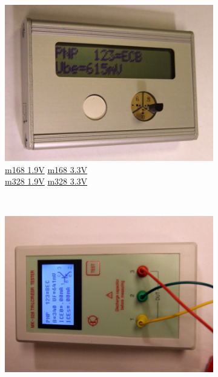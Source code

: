 \documentclass[pdftex,12pt,a4paper,english]{article}
\begin{document}
\begin{figure}[H]
  \begin{subfigure}[b]{.3\textwidth}
    \centering
    \includegraphics[width=1.\textwidth]{../PNG/Fifi_total.JPG}
	  \\ \vspace{-1.em}
	  {\href{run:./trunk/mega168_1.9V/.}{m168 1.9V}} \hspace{10pt}
	  {\href{run:./trunk/mega168_3.3V/.}{m168 3.3V}} \\
	  {\href{run:./trunk/mega328_1.9V/.}{m328 1.9V}} \hspace{10pt}
	  {\href{run:./trunk/mega328_3.3V/.}{m328 3.3V}}
  \end{subfigure}
~
  \begin{subfigure}[b]{.3\textwidth}
    \centering
    \includegraphics[width=1.\textwidth]{../PNG/MK328_total.JPG}

\end{subfigure}
\end{figure}
\end{document}
